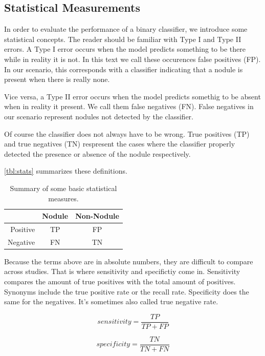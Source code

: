 \documentclass[titlepage, 10pt]{article}
\begin{document}
\subsection{Statistical Measurements}
In order to evaluate the performance of a binary classifier, we introduce some
statistical concepts. The reader should be familiar with Type I and Type II
errors. A Type I error occurs when the model predicts something to be there
while in reality it is not. In this text we call these occurences false
positives (FP). In our scenario, this corresponds with a classifier indicating
that a nodule is present when there is really none.

Vice versa, a Type II error occurs when the model predicts somethig to be absent
when in reality it present. We call them false negatives (FN). False negatives
in our scenario represent nodules not detected by the classifier.

Of course the classifier does not always have to be wrong. True positives (TP)
and true negatives (TN) respresent the cases where the classifier properly
detected the presence or absence of the nodule respectively.


\autoref{tbl:stats} summarizes these definitions.
\begin{table}[htp]
\begin{center}
	\begin{tabular}{r | c c}
						& Nodule 	& Non-Nodule \\
		    \hline
		    Positive 	& TP 		& FP\\
		    Negative 	& FN 		& TN \\
	\end{tabular}
	\caption{Summary of some basic statistical measures.}
	\label{tbl:stats}
\end{center}
\end{table}

Because the terms above are in absolute numbers, they are difficult to compare
across studies. That is where sensitivity and specifictiy come in. Sensitivity
compares the amount of true positives with the total amount of positives.
Synonyms include the true positive rate or the recall rate. Specificity does the
same for the negatives. It's sometimes also called true negative rate.

\begin{equation}
	sensitivity = \frac{TP}{TP + FP}
\end{equation}

\begin{equation}
	specificity = \frac{TN}{TN + FN}
\end{equation}
\end{document}
